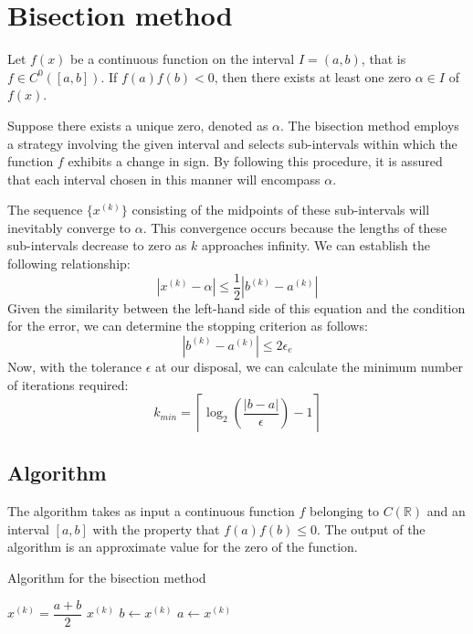 \section{Bisection method}

\newpage
\begin{theorem}
    Let $f(x)$ be a continuous function on the interval $I=(a,b)$, that is $f \in C^0([a,b])$. 
    If $f(a)f(b)<0$, then there exists at least one zero $\alpha \in I$ of $f(x)$. 
\end{theorem}
Suppose there exists a unique zero, denoted as $\alpha$. 
The bisection method employs a strategy involving the given interval and selects sub-intervals within which the function $f$ exhibits a change in sign.
By following this procedure, it is assured that each interval chosen in this manner will encompass $\alpha$. 

The sequence $\{x^{(k)}\}$ consisting of the midpoints of these sub-intervals will inevitably converge to $\alpha$. 
This convergence occurs because the lengths of these sub-intervals decrease to zero as $k$ approaches infinity.
We can establish the following relationship:
\[\left\lvert x^{(k)} - \alpha \right\rvert \leq \dfrac{1}{2} \left\lvert b^{(k)}-a^{(k)} \right\rvert \]
Given the similarity between the left-hand side of this equation and the condition for the error, we can determine the stopping criterion as follows:
\[\left\lvert b^{(k)}-a^{(k)} \right\rvert \leq 2 \epsilon_e\]
Now, with the tolerance $\epsilon$ at our disposal, we can calculate the minimum number of iterations required:
\[k_{min}= \left\lceil {\log_2{\left( \dfrac{\left\lvert b-a \right\rvert}{\epsilon} \right)}-1}\right\rceil\]

\subsection*{Algorithm}
The algorithm takes as input a continuous function $f$ belonging to $C(\mathbb{R})$ and an interval $[a,b]$ with the property that $f(a)f(b) \leq 0$. 
The output of the algorithm is an approximate value for the zero of the function.
\begin{algorithm}[H]
    \caption{Algorithm for the bisection method}
        \begin{algorithmic}[1]
                \State $x^{(k)}=\dfrac{a+b}{2}$
                    \State \Return $x^{(k)}$
                    \State $b \leftarrow x^{(k)}$
                \Else 
                    \State $a \leftarrow x^{(k)}$
                \EndIf
            \EndFor
        \end{algorithmic}
\end{algorithm}

